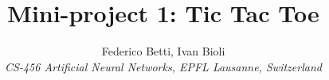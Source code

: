 \documentclass[10pt]{IEEEtran}
\begin{document}
\title{Mini-project 1: Tic Tac Toe}

\author{
   Federico Betti, Ivan Bioli\\
  \textit{CS-456 Artificial Neural Networks, EPFL Lausanne, Switzerland}
}


\maketitle


\begin{abstract}
    \lipsum[1]
\end{abstract}

\lipsum[1-5]

\nocite{*}
\printbibliography
\end{document}
